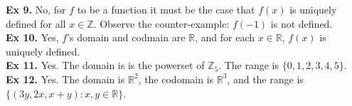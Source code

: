 \documentclass{article}
\begin{document}
\noindent\textbf{Ex 9.} No, for $f$ to be a function it must be the case that $f(x)$ is uniquely defined for all $x \in \mathbb{Z}$. Observe the counter-example: $f(-1)$ is not defined.\\

\noindent\textbf{Ex 10.} Yes, $f$'s domain and codmain are $\mathbb{R}$, and for each $x \in \mathbb{R}$, $f(x)$ is uniquely defined.\\

\noindent\textbf{Ex 11.} Yes. The domain is is the powerset of $\mathbb{Z}_5$. The range is $\{0,1,2,3,4, 5 \}$.\\

\noindent\textbf{Ex 12.} Yes. The domain is $\mathbb{R}^2$, the codomain is $\mathbb{R}^3$, and the range is $\{(3y, 2x, x+y) : x,y \in \mathbb{R} \}$.
\end{document}
